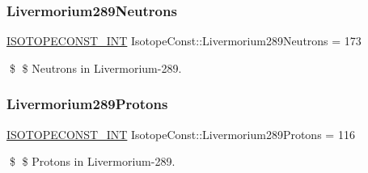 \subsubsection{\texorpdfstring{Livermorium289\+Neutrons}{Livermorium289Neutrons}}
{\footnotesize\ttfamily \mbox{\hyperlink{group___isotope_const-_macros_ga5f18360b3e99483a35c32d789e62621c}{I\+S\+O\+T\+O\+P\+E\+C\+O\+N\+S\+T\+\_\+\+I\+NT}} Isotope\+Const\+::\+Livermorium289\+Neutrons = 173}

\$ \$ Neutrons in Livermorium-\/289. \mbox{\label{group___isotope_const-_livermorium-_lv289_gab710c46596f0002b1f6acda11e062213}} 
\subsubsection{\texorpdfstring{Livermorium289\+Protons}{Livermorium289Protons}}
{\footnotesize\ttfamily \mbox{\hyperlink{group___isotope_const-_macros_ga5f18360b3e99483a35c32d789e62621c}{I\+S\+O\+T\+O\+P\+E\+C\+O\+N\+S\+T\+\_\+\+I\+NT}} Isotope\+Const\+::\+Livermorium289\+Protons = 116}

\$ \$ Protons in Livermorium-\/289. 